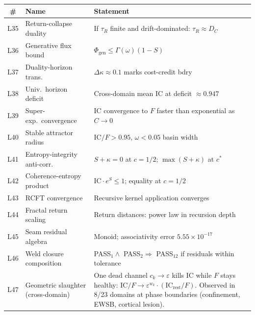\documentclass[
  aps,
  prd,
  twocolumn,
  superscriptaddress,
  nofootinbib,
  floatfix
]{revtex4-2}
\newcommand{\tR}{\tau_{\!R}}
\newcommand{\Gam}{\Gamma}
\newcommand{\eps}{\varepsilon}
\newcommand{\IC}{\mathrm{IC}}
\begin{document}
\begin{center}
{\small\begin{tabular}{@{}clp{3.7cm}@{}}
\toprule
\textbf{\#} & \textbf{Name} & \textbf{Statement} \\
\midrule
L35 & Return-collapse duality & If $\tR$ finite and drift-dominated: $\tR \approx D_C$ \\
L36 & Generative flux bound & $\Phi_\mathrm{gen} \leq \Gam(\omega)(1{-}S)$ \\
L37 & Duality-horizon trans.\ & $\Delta\kappa \approx 0.1$ marks cost-credit bdry \\
L38 & Univ.\ horizon deficit & Cross-domain mean $\IC$ at deficit $\approx 0.947$ \\
L39 & Super-exp.\ convergence & IC convergence to $F$ faster than exponential as $C \to 0$ \\
L40 & Stable attractor radius & $\IC/F > 0.95$, $\omega < 0.05$ basin width \\
L41 & Entropy-integrity anti-corr.\ & $S + \kappa = 0$ at $c = 1/2$; $\max(S{+}\kappa)$ at $c^*$ \\
L42 & Coherence-entropy product & $\IC \cdot e^S \leq 1$; equality at $c = 1/2$ \\
L43 & RCFT convergence & Recursive kernel application converges \\
L44 & Fractal return scaling & Return distances: power law in recursion depth \\
L45 & Seam residual algebra & Monoid; associativity error $5.55 \times 10^{-17}$ \\
L46 & Weld closure composition & PASS$_1 \wedge$ PASS$_2 \Rightarrow$ PASS$_{12}$ if residuals within tolerance \\
L47 & Geometric slaughter (cross-domain) & One dead channel $c_k \to \eps$ kills $\IC$ while $F$ stays healthy: $\IC/F \to \eps^{w_k} \cdot (\IC_\mathrm{rest}/F)$.  Observed in 8/23 domains at phase boundaries (confinement, EWSB, cortical lesion). \\
\bottomrule
\end{tabular}}
\end{center}
\end{document}

